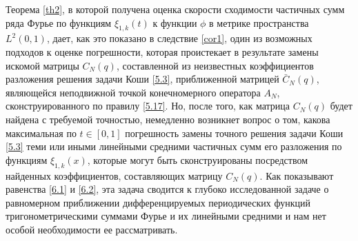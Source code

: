 \documentclass{article}
\numberwithin{equation}{section}
\theoremstyle{plain}
\theoremstyle{definition}
\begin{document}
\begin{fulltext}
 Теорема \ref{th2}, в которой получена оценка скорости сходимости частичных сумм  ряда Фурье по функциям  $\xi_{1,k}(t)$ к функции $\phi$ в метрике пространства $L^2(0,1)$, дает, как это показано в следствие \ref{cor1}, один из возможных подходов к оценке погрешности, которая проистекает в результате замены искомой матрицы $C_N(q)$, составленной из неизвестных коэффициентов  разложения решения задачи Коши \eqref{5.3}, приближенной матрицей $\bar C_N(q)$, являющейся неподвижной точкой конечномерного оператора $A_N$, сконструированного по правилу \eqref{5.17}. Но, после того, как  матрица   $C_N(q)$ будет  найдена с требуемой точностью, немедленно возникнет вопрос о том, какова максимальная по $t\in[0,1]$ погрешность замены точного решения  задачи Коши \eqref{5.3} теми или иными линейными средними частичных сумм его разложения по функциям $\xi_{1,k}(x)$, которые могут быть сконструированы посредством найденных коэффициентов, составляющих матрицу $C_N(q)$.
  Как показывают равенства \eqref{6.1} и \eqref{6.2}, эта задача сводится к  глубоко исследованной  задаче о равномерном приближении дифференцируемых периодических функций тригонометрическими суммами Фурье и  их линейными средними и нам нет особой необходимости ее рассматривать.

\end{fulltext}
\end{document}
